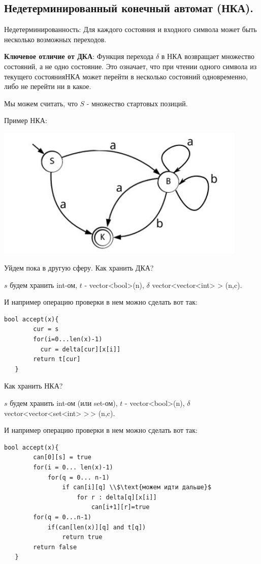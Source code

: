 \subsection{Недетерминированный конечный автомат (НКА).}

Недетерминированность: Для каждого состояния и входного символа может быть несколько возможных переходов.

\textbf{Ключевое отличие от ДКА}: Функция перехода $\delta$ в НКА возвращает множество состояний, а не одно состояние. Это означает, что при чтении одного символа из текущего состоянияНКА может перейти в несколько состояний одновременно, либо не перейти ни в какое.

Мы можем считать, что $S$ - множество стартовых позиций.

Пример НКА:
\begin{center}
    \includegraphics[width = 12cm]{assets/8_1_1.jpg}
\end{center}

Уйдем пока в другую сферу. Как хранить ДКА?

$s$ будем хранить int-ом, $t$ - vector<bool>(n), $\delta$ vector<vector<int> > (n,c). 

И например операцию проверки в нем можно сделать вот так:

\begin{lstlisting}[mathescape]
   bool accept(x){
        cur = s
        for(i=0...len(x)-1)
          cur = delta[cur][x[i]]
        return t[cur]
   }
\end{lstlisting}
Как хранить НКА?

$s$ будем хранить int-ом (или set-ом), $t$ - vector<bool>(n), $\delta$ vector<vector<set<int> >\,> (n,c). 

И например операцию проверки в нем можно сделать вот так:

\begin{lstlisting}[mathescape]
   bool accept(x){
        can[0][s] = true
        for(i = 0... len(x)-1)
            for(q = 0... n-1)
                if can[i][q] \\$\text{можем идти дальше}$
                    for r : delta[q][x[i]]
                        can[i+1][r]=true
        for(q = 0...n-1)
            if(can[len(x)][q] and t[q])
                return true
        return false
   }
\end{lstlisting}

